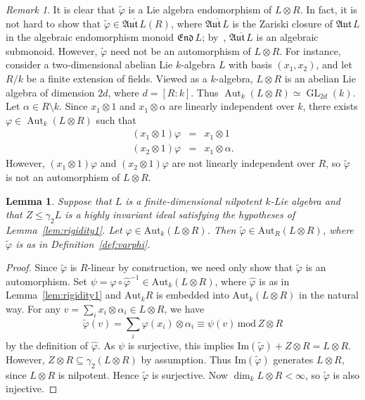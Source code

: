\documentclass[11pt,a4paper]{amsart}
\theoremstyle{plain}
\newtheorem{lemma}[thm]{Lemma}
\theoremstyle{remark}
\newtheorem{rem}[thm]{Remark}
\newcommand{\tensor}{\otimes}
\DeclareMathOperator{\GL}{GL}
\DeclareMathOperator{\Aut}{Aut}
\def \aAut {\mathfrak{Aut} \,}
\def \aEnd {\mathfrak{End} \,}
\begin{document}
\begin{rem}
It is clear that $\widetilde{\varphi}$ is a Lie algebra endomorphism of $L \otimes R$.  In fact, it is not hard to show that $\widetilde{\varphi} \in \overline{\aAut L}(R)$, where $\overline{\aAut L}$ is the Zariski closure of $\aAut L$ in the algebraic endomorphism monoid $\aEnd L$; by~\cite[Lemma 1.2]{Putcha/82}, $\overline{\aAut L}$ is an algebraic submonoid.  However, $\widetilde{\varphi}$ need not be an automorphism of $L \tensor R$.  For instance, consider a two-dimensional abelian Lie $k$-algebra $L$ with basis $(x_1, x_2)$, and let $R/k$ be a finite extension of fields.  Viewed as a $k$-algebra, $L \tensor R$ is an abelian Lie algebra of dimension $2d$, where $d = [R : k]$.  Thus $\Aut_{k} (L \tensor R) \simeq \GL_{2d} (k)$.  Let $\alpha \in R \setminus k$.  Since $x_1 \tensor 1$ and $x_1 \tensor \alpha$ are linearly independent over $k$, there exists $\varphi \in \Aut_{k} (L \tensor R)$ such that
\begin{eqnarray*}
 (x_1 \tensor 1)\varphi & = & x_1 \tensor 1 \\
 (x_2 \tensor 1)\varphi & = & x_1 \tensor \alpha.
\end{eqnarray*}
However, $(x_1 \tensor 1)\varphi$ and $(x_2 \tensor 1)\varphi$ are not linearly independent over $R$, so $\widetilde{\varphi}$ is not an automorphism of $L \tensor R$.  
\end{rem}


\begin{lemma} \label{lem:rigidity2}
Suppose that $L$ is a finite-dimensional nilpotent $k$-Lie algebra and that $Z \leq \gamma_2 L$ is a highly invariant ideal satisfying the hypotheses of Lemma~\ref{lem:rigidity1}.  Let $\varphi \in \mathrm{Aut}_k (L \otimes R)$.  Then $\widetilde{\varphi} \in \mathrm{Aut}_R(L \otimes R)$, where $\widetilde{\varphi}$ is as in Definition~\ref{def:varphi}.
\end{lemma}
\begin{proof}
Since $\widetilde{\varphi}$ is $R$-linear by construction, we need only show that $\widetilde{\varphi}$ is an automorphism.  Set $\psi = \varphi \circ \widehat{\varphi}^{-1} \in \mathrm{Aut}_k (L \otimes R)$, where $\widehat{\varphi}$ is as in Lemma~\ref{lem:rigidity1} and $\mathrm{Aut}_k R$ is embedded into $\mathrm{Aut}_k (L \otimes R)$ in the natural way.  For any $v = \sum_i x_i \otimes \alpha_i \in L \otimes R$, we have
\begin{equation} \label{equ:semidirect.product}
\widetilde{\varphi}(v) =  \sum_i \varphi(x_i) \otimes \alpha_i \equiv \psi(v) \, \mathrm{mod} \, Z \otimes R
\end{equation}
by the definition of $\widehat{\varphi}$.  As $\psi$ is surjective, this implies $\mathrm{Im} (\widetilde{\varphi}) + Z \otimes R = L \otimes R$.  However, $Z \otimes R \subseteq \gamma_2 (L \otimes R)$ by assumption.  Thus $\mathrm{Im}(\widetilde{\varphi})$ generates $L \otimes R$, since $L \tensor R$ is nilpotent.  Hence $\widetilde{\varphi}$ is surjective.  Now $\dim_k L \otimes R < \infty$, so $\widetilde{\varphi}$ is also injective.
\end{proof}
\end{document}
